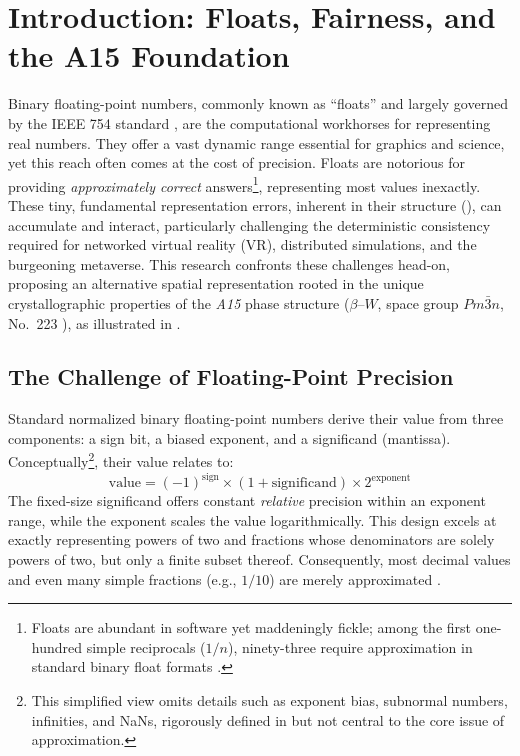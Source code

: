 \documentclass[10pt]{article}
\def\AAAB{\textit{A15}}
\def\betaW{$\beta$--$W$}
\begin{document}
\section{Introduction: Floats, Fairness, and the A15 Foundation}\label{sec-introduction}

Binary floating-point numbers, commonly known as ``floats'' and largely governed by the IEEE 754 standard \cite{IEEE754-2019}, are the computational workhorses for representing real numbers. They offer a vast dynamic range essential for graphics and science, yet this reach often comes at the cost of precision. Floats are notorious for providing \emph{approximately correct} answers\footnote{Floats are abundant in software yet maddeningly fickle; among the first one-hundred simple reciprocals ($1/n$), ninety-three require approximation in standard binary float formats \cite{Goldberg1991}.}, representing most values inexactly. These tiny, fundamental representation errors, inherent in their structure (), can accumulate and interact, particularly challenging the deterministic consistency required for networked virtual reality (VR), distributed simulations, and the burgeoning metaverse. This research confronts these challenges head-on, proposing an alternative spatial representation rooted in the unique crystallographic properties of the \AAAB{} phase structure (\betaW{}, space group $Pm\bar{3}n$, No.~223 \cite{ITCVolumeA2016}), as illustrated in .

\subsection{The Challenge of Floating-Point Precision}\label{subsec-intro-floats}

Standard normalized binary floating-point numbers derive their value from three components: a sign bit, a biased exponent, and a significand (mantissa). Conceptually\footnote{This simplified view omits details such as exponent bias, subnormal numbers, infinities, and NaNs, rigorously defined in \cite{IEEE754-2019} but not central to the core issue of approximation.}, their value relates to:
\begin{equation} \label{eq-float-representation}
    \text{value} = (-1)^{\text{sign}} \times (1 + \text{significand}) \times 2^{\text{exponent}}
\end{equation}
The fixed-size significand offers constant \emph{relative} precision within an exponent range, while the exponent scales the value logarithmically. This design excels at exactly representing powers of two and fractions whose denominators are solely powers of two, but only a finite subset thereof. Consequently, most decimal values and even many simple fractions (e.g., $1/10$) are merely approximated \cite{Goldberg1991}.
\end{document}
